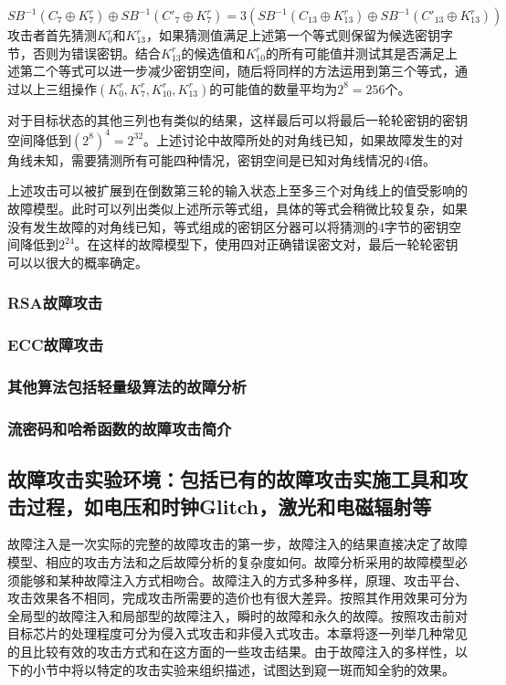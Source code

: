 \documentclass[a4paper,12pt]{article}
\begin{document}
\begin{CJK}{UTF8}{gkai}
\begin{equation}
	SB^{-1}(C_{7}\oplus K^{r}_{7}) \oplus SB^{-1}(C'_{7} \oplus K^{r}_{7} ) = 3(SB^{-1}(C_{13}\oplus K^{r}_{13}) \oplus SB^{-1}(C'_{13} \oplus K^{r}_{13} ) )
	\end{equation}
攻击者首先猜测$K^{r}_{0}$和$K^{r}_{13}$，如果猜测值满足上述第一个等式则保留为候选密钥字节，否则为错误密钥。结合$K^{r}_{13}$的候选值和$K^{r}_{10}$的所有可能值并测试其是否满足上述第二个等式可以进一步减少密钥空间，随后将同样的方法运用到第三个等式，通过以上三组操作$(K^{r}_{0}, K^{r}_{7}, K^{r}_{10}, K^{r}_{13})$的可能值的数量平均为$2^{8} = 256$个。

对于目标状态的其他三列也有类似的结果，这样最后可以将最后一轮轮密钥的密钥空间降低到$(2^{8})^{4}=2^{32}$。上述讨论中故障所处的对角线已知，如果故障发生的对角线未知，需要猜测所有可能四种情况，密钥空间是已知对角线情况的4倍。

上述攻击可以被扩展到在倒数第三轮的输入状态上至多三个对角线上的值受影响的故障模型。此时可以列出类似上述所示等式组，具体的等式会稍微比较复杂，如果没有发生故障的对角线已知，等式组成的密钥区分器可以将猜测的4字节的密钥空间降低到$2^{24}$。在这样的故障模型下，使用四对正确错误密文对，最后一轮轮密钥可以以很大的概率确定。

\subsubsection{RSA故障攻击}
\subsubsection{ECC故障攻击}
\subsubsection{其他算法包括轻量级算法的故障分析}
\subsubsection{流密码和哈希函数的故障攻击简介}

\subsection{故障攻击实验环境：包括已有的故障攻击实施工具和攻击过程，如电压和时钟Glitch，激光和电磁辐射等}
故障注入是一次实际的完整的故障攻击的第一步，故障注入的结果直接决定了故障模型、相应的攻击方法和之后故障分析的复杂度如何。故障分析采用的故障模型必须能够和某种故障注入方式相吻合。故障注入的方式多种多样，原理、攻击平台、攻击效果各不相同，完成攻击所需要的造价也有很大差异。按照其作用效果可分为全局型的故障注入和局部型的故障注入，瞬时的故障和永久的故障。按照攻击前对目标芯片的处理程度可分为侵入式攻击和非侵入式攻击。本章将逐一列举几种常见的且比较有效的攻击方式和在这方面的一些攻击结果。由于故障注入的多样性，以下的小节中将以特定的攻击实验来组织描述，试图达到窥一斑而知全豹的效果。


\end{CJK}
\end{document}
